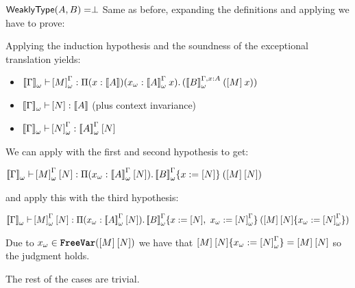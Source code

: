 \begin{Proof}
\begin{ProofCase}{\CicApp}
\begin{SubProofCase}{$\weaklypropFun[A,B] = \False$}
Same as before, expanding the definitions and applying  we have to prove:
\begin{center}
\end{center}
Applying the induction hypothesis and the soundness of the exceptional translation yields:
\begin{itemize}
\item $\ctyping[\WContextTrans{\Context}][]{\WParamTrans{M}}{
                \depArrow{x}{\TypeTrans{A}}{\WTermTrans{x}}{\app{\WParamTypeTrans{A}}{x}}{(
                          \app{\WParamTypeTrans[\Context,\typing{x}{A}]{B}}{(\app{\Trans{M}}{x})})}}$
\item $\ctyping[\WContextTrans{\Context}][]{\Trans{N}}{\TypeTrans{A}}$ (plus context invariance)
\item $\ctyping[\WContextTrans{\Context}][]{\WParamTrans{N}}{\app{\WParamTypeTrans{A}}{\Trans{N}}}$
\end{itemize}
\end{SubProofCase}
We can apply \CicApp{} with the first and second hypothesis to get:
\begin{center}
$\ctyping[\WContextTrans{\Context}][]{
         \app{\WParamTrans{M}}{\Trans{N}}}{
              \enDepArrow{\WTermTrans{x}}{\app{\WParamTypeTrans{A}}{\Trans{N}}}{
                         \app{\subst{\WParamTypeTrans{B}}{x}{\Trans{N}}}}{
              (\app{\Trans{M}}{\Trans{N}})}}$
\end{center}
and apply this with the third hypothesis:
\begin{center}
$\ctyping[\WContextTrans{\Context}][]{
         \app{\WParamTrans{M}}{\Trans{N}}}{
              \enDepArrow{\WTermTrans{x}}{\app{\WParamTypeTrans{A}}{\Trans{N}}}{
                         \app{\subst{\WParamTypeTrans{B}}{x}{\Trans{N}}{\WTermTrans{x}}{\WParamTrans{N}}}}{
              (\subst{\app{\Trans{M}}{\Trans{N}}}{\WTermTrans{x}}{\WParamTrans{N}})}}$
\end{center}
Due to $\WTermTrans{x}\in\FreeVar{\app{\Trans{M}}{\Trans{N}}}$ we have that 
$\subst{\app{\Trans{M}}{\Trans{N}}}{\WTermTrans{x}}{\WParamTrans{N}}\termEq\app{\Trans{M}}{\Trans{N}}$
so the judgment holds.
\end{ProofCase}

\noindent The rest of the cases are trivial.
\end{Proof}

